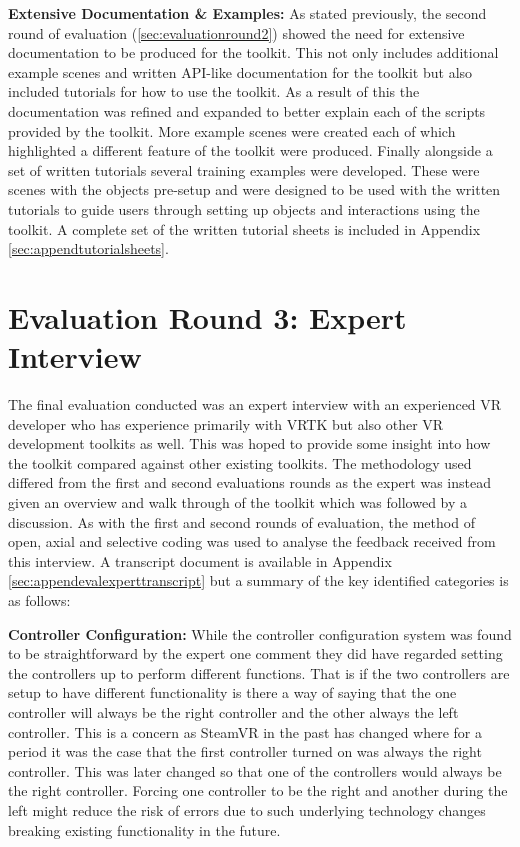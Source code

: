 \documentclass{l4proj}
\begin{document}
\textbf{Extensive Documentation \& Examples:} As stated previously, the second round of evaluation (\ref{sec:evaluationround2}) showed the need for extensive documentation to be produced for the toolkit. This not only includes additional example scenes and written API-like documentation for the toolkit but also included tutorials for how to use the toolkit. As a result of this the documentation was refined and expanded to better explain each of the scripts provided by the toolkit. More example scenes were created each of which highlighted a different feature of the toolkit were produced. Finally alongside a set of written tutorials several training examples were developed. These were scenes with the objects pre-setup and were designed to be used with the written tutorials to guide users through setting up objects and interactions using the toolkit. A complete set of the written tutorial sheets is included in Appendix \ref{sec:appendtutorialsheets}.

\section{Evaluation Round 3: Expert Interview}
\label{sec:evaluationround3}
The final evaluation conducted was an expert interview with an experienced VR developer who has experience primarily with VRTK but also other VR development toolkits as well. This was hoped to provide some insight into how the toolkit compared against other existing toolkits. The methodology used differed from the first and second evaluations rounds as the expert was instead given an overview and walk through of the toolkit which was followed by a discussion. As with the first and second rounds of evaluation, the method of open, axial and selective coding \cite{openaxebook} was used to analyse the feedback received from this interview. A transcript document is available in Appendix \ref{sec:appendevalexperttranscript} but a summary of the key identified categories is as follows:

\textbf{Controller Configuration:} While the controller configuration system was found to be straightforward by the expert one comment they did have regarded setting the controllers up to perform different functions. That is if the two controllers are setup to have different functionality is there a way of saying that the one controller will always be the right controller and the other always the left controller. This is a concern as SteamVR in the past has changed where for a period it was the case that the first controller turned on was always the right controller. This was later changed so that one of the controllers would always be the right controller. Forcing one controller to be the right and another during the left might reduce the risk of errors due to such underlying technology changes breaking existing functionality in the future. 
\end{document}
